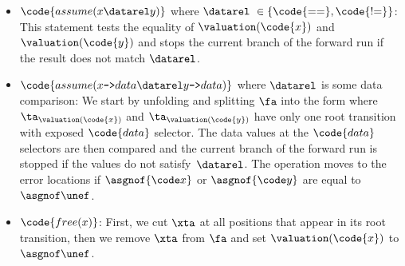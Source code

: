 \begin{itemize}
      \item $\code{assume(x \datarel y)}$ where $\datarel\ \in \{\code{==},
        \code{{!}{=}}\}$:
        This statement tests the equality of $\valuation(\code{x})$ and $\valuation(\code{y})$
        and stops the current branch of the forward run if the result does not match $\datarel$.
      \item $\code{assume(x\text{\texttt{->}}data \datarel y\text{\texttt{->}}data)}$
        where $\datarel$ is some data comparison:
        We start by unfolding and splitting $\fa$ into the form where
        $\ta_{\valuation(\code{x})}$ and $\ta_{\valuation(\code{y})}$ have only
        one root transition with exposed $\code{data}$ selector.
        The data values at the $\code{data}$ selectors are then compared and
        the current branch of the forward run is stopped if the values do not satisfy~$\datarel$.
        The operation moves to the error locations if $\asgnof{\code x}$ or
        $\asgnof{\code y}$ are equal to~$\asgnof \unef$.


		  \item $\code{free(x)}$:
        First, we cut $\xta$ at all positions that appear in its root
        transition, then we remove $\xta$ from $\fa$ and set
        $\valuation(\code{x})$ to $\asgnof \unef$. 
		\end{itemize}


